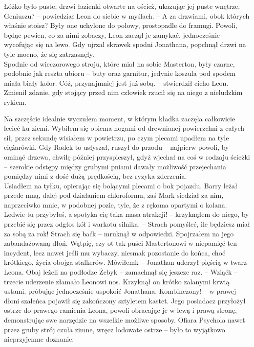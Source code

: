 \documentclass[../MAIN.tex]{subfiles}
\begin{document}
Łóżko było puste, drzwi łazienki otwarte na oścież, ukazując jej puste wnętrze.
\sx Geniuszu? -- powiedział Leon do siebie w myślach. -- A za drzwiami, obok których właśnie stoisz?
\qd
Były one uchylone do połowy, prostopadle do framugi.
Powoli, będąc pewien, co za nimi zobaczy, Leon zaczął je zamykać, jednocześnie wycofując się na lewo. Gdy ujrzał skrawek spodni Jonathana, popchnął drzwi na tyle mocno, że się zatrzasnęły.\\
Spodnie od wieczorowego stroju, które miał na sobie Masterton, były czarne, podobnie jak reszta ubioru -- buty oraz garnitur, jedynie koszula pod spodem miała biały kolor. Cóż, przynajmniej jest już sobą. -- stwierdził cicho Leon. Zmienił zdanie, gdy stojący przed nim człowiek rzucił się na niego z nieludzkim rykiem.

Na szczęście idealnie wyczułem moment, w którym kładka zaczęła całkowicie lecieć ku ziemi. Wybiłem się obiema nogami od drewnianej powierzchni z całych sił, przez sekundę wisiałem w powietrzu, po czym plecami upadłem na tyle ciężarówki. Gdy Radek to usłyszał, ruszył do przodu -- najpierw powoli, by ominąć drzewa, chwilę później przyspieszył, gdyż wjechał na coś w rodzaju ścieżki -- szerokie odstępy między grubymi pniami dawały możliwość przejechania pomiędzy nimi z dość dużą prędkością, bez ryzyka zderzenia.\\
Usiadłem na tyłku, opierając się bolącymi plecami o bok pojazdu. Barry leżał przede mną, dalej pod działaniem chloroformu, zaś Mark siedział za nim, naprzeciwko mnie, w podobnej pozie, tyle, że z rękoma opartymi o kolana.
\sx Ledwie tu przybyłeś, a spotyka cię taka masa atrakcji! -- krzyknąłem do niego, by przebić się przez odgłos kół i warkotu silnika. -- Strach pomyśleć, ile będziesz miał za sobą za rok!
\xx Strach się bać\3k -- mruknął w odpowiedzi.
\qd
Spojrzałem na jego zabandażowaną dłoń. Wątpię, czy ot tak puści Mastertonowi w niepamięć ten incydent, lecz nawet jeśli mu wybaczy, niesmak pozostanie do końca, choć krótkiego, życia obojga stalkerów.
\sx Mówiłem\3k -- Jonathan uderzył pięścią w twarz Leona.
\qd
Obaj leżeli na podłodze
\sx Żeby\3k -- zamachnął się jeszcze raz. -- Wziąć\3k -- trzecie uderzenie złamało Leonowi nos. 
\qd
Krzyknął on krótko zalanymi krwią ustami, próbując jednocześnie uspokoić Jonathana. 
\sx Kombinezony! -- w prawej dłoni szaleńca pojawił się zakończony sztyletem kastet. 
\qd
Jego posiadacz przyłożył ostrze do prawego ramienia Leona, powoli obracając je w lewą i prawą stronę, demonstrując swe narzędzie na wszelkie możliwe sposoby. Ofiara Psychola nawet przez gruby strój czuła zimne, wręcz lodowate ostrze -- było to wyjątkowo nieprzyjemne doznanie.
\end{document}
